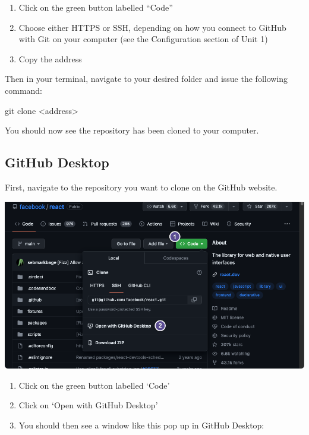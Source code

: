 \documentclass[
  letterpaper,
  DIV=11,
  numbers=noendperiod]{scrartcl}
\newenvironment{Shaded}{\begin{snugshade}}{\end{snugshade}}
\newcommand{\NormalTok}[1]{\textcolor[rgb]{0.00,0.23,0.31}{#1}}
\newcommand{\SpecialCharTok}[1]{\textcolor[rgb]{0.37,0.37,0.37}{#1}}
\begin{document}
\begin{enumerate}
\def\labelenumi{\arabic{enumi}.}
\item
  Click on the green button labelled ``Code''
\item
  Choose either HTTPS or SSH, depending on how you connect to GitHub
  with Git on your computer (see the Configuration section of Unit 1)
\item
  Copy the address
\end{enumerate}

Then in your terminal, navigate to your desired folder and issue the
following command:

\begin{Shaded}
\begin{Highlighting}[]
\NormalTok{git clone }\SpecialCharTok{\textless{}}\NormalTok{address}\SpecialCharTok{\textgreater{}}
\end{Highlighting}
\end{Shaded}

You should now see the repository has been cloned to your computer.

\subsection{GitHub Desktop}

First, navigate to the repository you want to clone on the GitHub
website.

\includegraphics{images/image24.png}

\begin{enumerate}
\def\labelenumi{\arabic{enumi}.}
\item
  Click on the green button labelled `Code'
\item
  Click on `Open with GitHub Desktop'
\item
  You should then see a window like this pop up in GitHub Desktop:
\end{enumerate}
\end{document}
